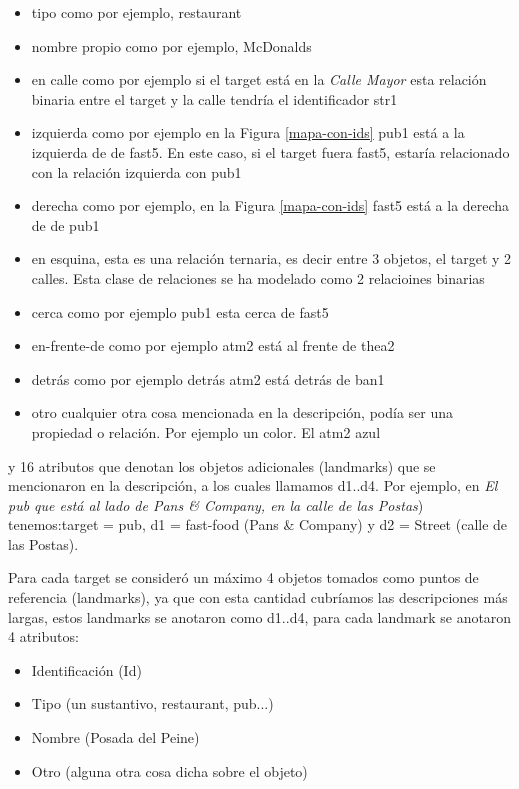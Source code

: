 \begin{itemize}
  \item tipo como por ejemplo, restaurant
  \item nombre propio como por ejemplo, McDonalds
  \item en calle como por ejemplo si el target est\'a en la {\it Calle Mayor} esta relaci\'on binaria entre el target y la calle tendr\'ia el identificador str1
  \item izquierda como por ejemplo en la Figura \ref{mapa-con-ids} pub1 est\'a a la izquierda de de fast5. En este caso, si el target fuera fast5, estar\'ia relacionado con la relaci\'on izquierda con pub1
  \item derecha como por ejemplo, en la Figura \ref{mapa-con-ids} fast5 est\'a a la derecha de de pub1
  \item en esquina, esta es una relaci\'on ternaria, es decir entre 3 objetos, el target y 2 calles. Esta clase de relaciones se ha modelado como 2 relacioines binarias    
  \item cerca como por ejemplo pub1 esta cerca de fast5
  \item en-frente-de como por ejemplo atm2 est\'a al frente de thea2
  \item detr\'as como por ejemplo detr\'as atm2 est\'a detr\'as de ban1
  \item otro cualquier otra cosa mencionada en la descripci\'on, pod\'ia ser una propiedad o relaci\'on. Por ejemplo un color. El atm2 azul
\end{itemize}
y 16 atributos que denotan los objetos adicionales (landmarks) que se mencionaron en la descripci\'on, a los cuales llamamos d1..d4. Por ejemplo, en {\it El pub que est\'a al lado de Pans \& Company, en la calle de las Postas}) tenemos:target = pub, d1 = fast-food (Pans \& Company) y d2 = Street (calle de las Postas).

Para cada target se consider\'o un m\'aximo 4 objetos tomados como puntos de referencia (landmarks), ya que con esta cantidad cubr\'iamos las descripciones m\'as largas, estos landmarks se anotaron como d1..d4, para cada landmark se anotaron 4 atributos:
\begin{itemize}
  \item Identificaci\'on (Id)
  \item Tipo (un sustantivo, restaurant, pub...)
  \item Nombre (Posada del Peine)
  \item Otro (alguna otra cosa dicha sobre el objeto)
\end{itemize}

